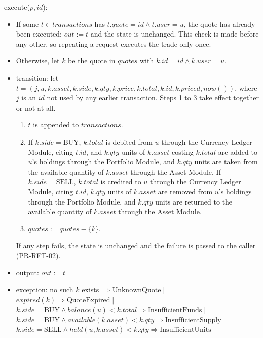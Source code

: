 \documentclass[12pt, titlepage]{article}
\begin{document}
\medskip

\noindent execute($p, \mathit{id}$):
\begin{itemize}
\item If some $t \in \mathit{transactions}$ has $t.\mathit{quote} =
  \mathit{id} \wedge t.\mathit{user} = u$, the quote has already been
  executed: $\mathit{out} := t$ and the state is unchanged. This check is
  made before any other, so repeating a request executes the trade only
  once.
\item Otherwise, let $k$ be the quote in $\mathit{quotes}$ with
  $k.\mathit{id} = \mathit{id} \wedge k.\mathit{user} = u$.
\item transition: let $t = (j, u, k.\mathit{asset}, k.\mathit{side},
  k.\mathit{qty}, k.\mathit{price}, k.\mathit{total}, k.\mathit{id},
  k.\mathit{priced}, \mathit{now}())$, where $j$ is an $\mathit{id}$ not used
  by any earlier transaction. Steps 1 to 3 take effect together or not at
  all.
  \begin{enumerate}
  \item $t$ is appended to $\mathit{transactions}$.
  \item If $k.\mathit{side} = \mathrm{BUY}$, $k.\mathit{total}$ is debited
    from $u$ through the Currency Ledger Module, citing $t.\mathit{id}$, and
    $k.\mathit{qty}$ units of $k.\mathit{asset}$ costing $k.\mathit{total}$
    are added to $u$'s holdings through the Portfolio Module, and
    $k.\mathit{qty}$ units are taken from the available quantity of
    $k.\mathit{asset}$ through the Asset Module. If $k.\mathit{side} =
    \mathrm{SELL}$, $k.\mathit{total}$ is credited to $u$ through the
    Currency Ledger Module, citing $t.\mathit{id}$, $k.\mathit{qty}$ units of
    $k.\mathit{asset}$ are removed from $u$'s holdings through the Portfolio
    Module, and $k.\mathit{qty}$ units are returned to the available quantity
    of $k.\mathit{asset}$ through the Asset Module.
  \item $\mathit{quotes} := \mathit{quotes} - \{k\}$.
  \end{enumerate}
  If any step fails, the state is unchanged and the failure is passed to the
  caller (PR-RFT-02).
\item output: $\mathit{out} := t$
\item exception: no such $k$ exists $\Rightarrow \mathrm{UnknownQuote}
  \mid{}$ $\mathit{expired}(k) \Rightarrow \mathrm{QuoteExpired} \mid{}$
  $k.\mathit{side} = \mathrm{BUY} \wedge \mathit{balance}(u) <
  k.\mathit{total} \Rightarrow \mathrm{InsufficientFunds} \mid{}$
  $k.\mathit{side} = \mathrm{BUY} \wedge \mathit{available}(k.\mathit{asset})
  < k.\mathit{qty} \Rightarrow \mathrm{InsufficientSupply} \mid{}$
  $k.\mathit{side} = \mathrm{SELL} \wedge \mathit{held}(u, k.\mathit{asset})
  < k.\mathit{qty} \Rightarrow \mathrm{InsufficientUnits}$
\end{itemize}
\end{document}
